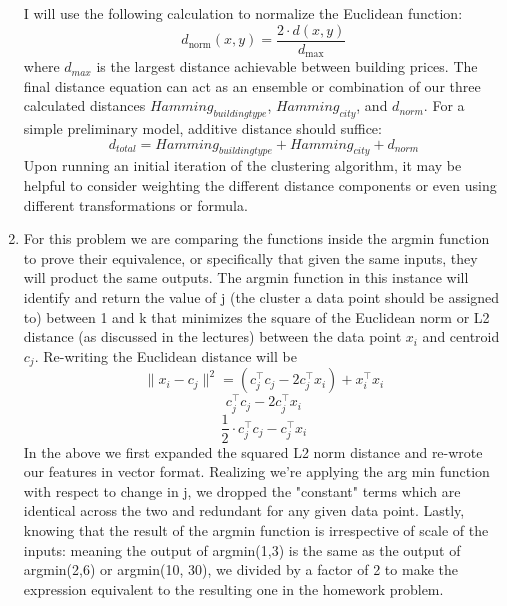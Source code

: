 \documentclass{article}
\begin{document}
\begin{enumerate}
I will use the following calculation to normalize the Euclidean function:
\begin{equation}
d_{\text{norm}}(x, y) = \frac{2 \cdot d(x, y)}{d_{\text{max}}}
\end{equation}
where $d_{max}$ is the largest distance achievable between building prices.
The final distance equation can act as an ensemble or combination of our three calculated distances
$Hamming_{buildingtype}$, $Hamming_{city}$, and $d_{norm}$. For a simple preliminary model, additive distance
should suffice:
\begin{equation}
d_{total} = Hamming_{buildingtype} + Hamming_{city} + d_{norm}
\end{equation}
Upon running an initial iteration of the clustering algorithm, it may be helpful to consider weighting the
different distance components or even using different transformations or formula.

\item For this problem we are comparing the functions inside the argmin function to prove their
equivalence, or specifically that given the same inputs, they will product the same outputs. The argmin
function in this instance will identify and return the value of j (the cluster a data point should be assigned to)
between 1 and k that minimizes the square of the Euclidean norm or L2 distance (as discussed in the lectures)
between the data point $x_i$ and centroid $c_j$. Re-writing the Euclidean distance will be
\begin{equation}
\|x_i - c_j\|^2 = (c_j^\top c_j - 2c_j^\top x_i) + x_i^\top x_i
\end{equation}
\begin{equation}
c_j^\top c_j - 2c_j^\top x_i
\end{equation}
\begin{equation}
\frac{1}{2} \cdot c_j^\top c_j - c_j^\top x_i
\end{equation}
In the above we first expanded the squared L2 norm distance and re-wrote our features in vector format.
Realizing we're applying the arg min function with respect to change in j, we dropped the "constant" terms
which are identical across the two and redundant for any given data point. Lastly, knowing that the result
of the argmin function is irrespective of scale of the inputs: meaning the output of argmin(1,3) is the
same as the output of argmin(2,6) or argmin(10, 30), we divided by a factor of 2 to make the expression
equivalent to the resulting one in the homework problem.


\end{enumerate}
\end{document}
